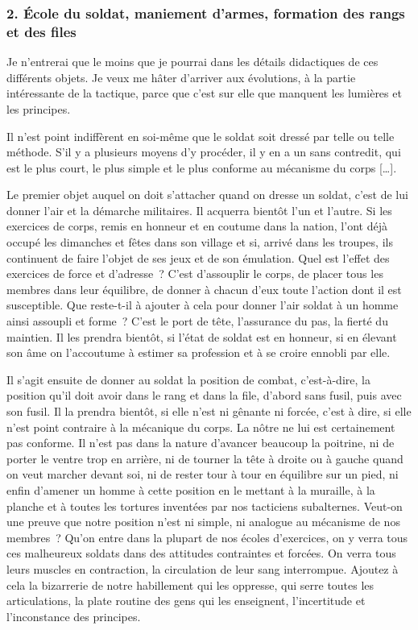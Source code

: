 \documentclass[french,twoside]{book} %
\begin{document}
\subsubsection[{2. École du soldat, maniement d’armes, formation des rangs et des files}]{2. École du soldat, maniement d’armes, formation des rangs et des files}
\noindent Je n’entrerai que le moins que je pourrai dans les détails didactiques de ces différents objets. Je veux me hâter d’arriver aux évolutions, à la partie intéressante de la tactique, parce que c’est sur elle que manquent les lumières et les principes.\par
Il n’est point indiffèrent en soi-même que le soldat soit dressé par telle ou telle méthode. S’il y a plusieurs moyens d’y procéder, il y en a un sans contredit, qui est le plus court, le plus simple et le plus conforme au mécanisme du corps […].\par
Le premier objet auquel on doit s’attacher quand on dresse un soldat, c’est de lui donner l’air et la démarche militaires. Il acquerra bientôt l’un et l’autre. Si les exercices de corps, remis en honneur et en coutume dans la nation, l’ont déjà occupé les dimanches et fêtes dans son village et si, arrivé dans les troupes, ils continuent de faire l’objet de ses jeux et de son émulation. Quel est l’effet des exercices de force et d’adresse ? C’est d’assouplir le corps, de placer tous les membres dans leur équilibre, de donner à chacun d’eux toute l’action dont il est susceptible. Que reste-t-il à ajouter à cela pour donner l’air soldat à un homme ainsi assoupli et forme ? C’est le port de tête, l’assurance du pas, la fierté du maintien. Il les prendra bientôt, si l’état de soldat est en honneur, si en élevant son âme on l’accoutume à estimer sa profession et à se croire ennobli par elle.\par
Il s’agit ensuite de donner au soldat la position de combat, c’est-à-dire, la position qu’il doit avoir dans le rang et dans la file, d’abord sans fusil, puis avec son fusil. Il la prendra bientôt, si elle n’est ni gênante ni forcée, c’est à dire, si elle n’est point contraire à la mécanique du corps. La nôtre ne lui est certainement pas conforme. Il n’est pas dans la nature d’avancer beaucoup la poitrine, ni de porter le ventre trop en arrière, ni de tourner la tête à droite ou à gauche quand on veut marcher devant soi, ni de rester tour à tour en équilibre sur un pied, ni enfin d’amener un homme à cette position en le mettant à la muraille, à la planche et à toutes les tortures inventées par nos tacticiens subalternes. Veut-on une preuve que notre position n’est ni simple, ni analogue au mécanisme de nos membres ? Qu’on entre dans la plupart de nos écoles d’exercices, on y verra tous ces malheureux soldats dans des attitudes contraintes et forcées. On verra tous leurs muscles en contraction, la circulation de leur sang interrompue. Ajoutez à cela la bizarrerie de notre habillement qui les oppresse, qui serre toutes les articulations, la plate routine des gens qui les enseignent, l’incertitude et l’inconstance des principes.\par
\end{document}
